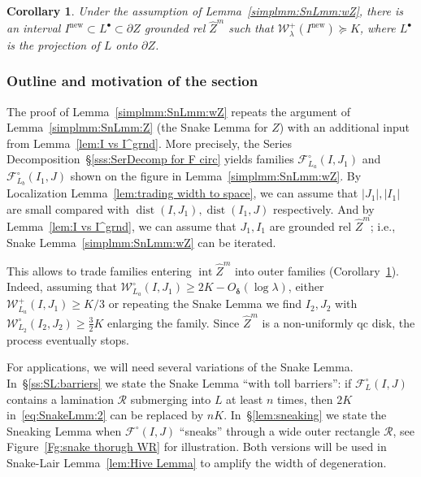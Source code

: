 \documentclass{amsart}
\newcommand{\1}{{\mathbb 1 }}
\newcommand{\reminder}[1]{\textsl{$\lhd\rhd$#1$\lhd\rhd$}\marginpar{$\lhd\rhd\lhd\rhd\lhd\rhd$}}
\newcommand{\Fam}{{\mathcal F}}
\newcommand{\Width}{{\mathcal W}}
\newcommand\RR{\mathcal{R}}
\newcommand\intr{\operatorname{int}}
\newcommand{\wZ}{{\widehat Z}}
\newcommand\new{{\operatorname{new}}}
\newtheorem{cor}[thm]{Corollary}
\theoremstyle{remark}
\numberwithin{equation}{section}
\theoremstyle{definition}
\newcommand{\dist}{\operatorname{dist}}
\newcommand{\bdelta}{{\boldsymbol{ \delta}}}
\begin{document}
\begin{cor}
\label{cor:SnakeLmm}
Under the assumption of Lemma~\ref{simplmm:SnLmm:wZ}, there is an interval $I^\new\subset L^\bullet\subset \partial Z$ grounded rel $\wZ^m$ such that $\Width^+_\lambda(I^\new)\succeq K$, where $L^\bullet$ is the projection of $L$ onto $\partial Z$.
\end{cor}


\subsubsection{Outline and motivation of the section} \label{sss:outline of snakes}  The proof of Lemma~\ref{simplmm:SnLmm:wZ} repeats the argument of Lemma~\ref{simplmm:SnLmm:Z} (the Snake Lemma for $Z$) with an additional input from Lemma~\ref{lem:I vs I^grnd}. More precisely, the Series Decomposition~\S\ref{sss:SerDecomp for F circ} yields families $\Fam^\circ_{L_a} (I,J_1)$ and $\Fam^\circ_{L_b} (I_1,J)$ shown on the figure in Lemma~\ref{simplmm:SnLmm:wZ}. By Localization Lemma~\ref{lem:trading  width to space}, we can assume that $|J_1|, |I_1|$ are small compared with $\dist(I,J_1),\dist(I_1,J)$ respectively. And by Lemma~\ref{lem:I vs I^grnd}, we can assume that $J_1,I_1$ are grounded rel $\wZ^m$; i.e., Snake Lemma~\ref{simplmm:SnLmm:wZ} can be iterated.


This allows to trade families entering $\intr \wZ^m$ into outer families (Corollary~\ref{cor:SnakeLmm}). Indeed, assuming that $\Width^\circ_{L_a} (I,J_1)\ge 2K -O_\bdelta(\log \lambda)$, either $\Width^+_{L_a} (I,J_1)\ge K/3$ or repeating the Snake Lemma we find $I_2,J_2$ with $\Width^\circ_{L_2} (I_2,J_2)\ge \frac 3 2  K $ enlarging the family. Since $\wZ^m$ is a non-uniformly qc disk, the process eventually stops.

For applications, we will need several variations of the Snake Lemma. In~\S\ref{ss:SL:barriers} we state the Snake Lemma ``with toll barriers'': if $\Fam^\circ_L(I,J)$ contains a lamination $\RR$ submerging into $L$ at least $n$ times, then $2K$ in~\eqref{eq:SnakeLmm:2} can be replaced by $nK$. In~\S\ref{lem:sneaking} we state the Sneaking Lemma when $\Fam^\circ(I,J)$ ``sneaks'' through a wide outer rectangle $\RR$, see Figure~\ref{Fg:snake thorugh WR} for illustration. Both versions will be used in Snake-Lair Lemma~\ref{lem:Hive Lemma} to amplify the width of degeneration. 
 


\end{document}
